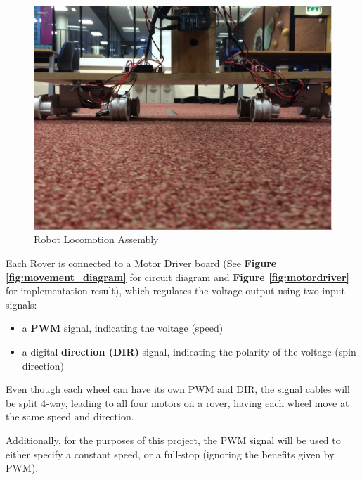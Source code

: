 \documentclass[12p,a4paper]{report}
\begin{document}
\begin{figure}[H]
\begin{center}
\includegraphics[scale=0.40]{rover5duo_low}
\caption{Robot Locomotion Assembly}
\label{fig:rover5duo}
\end{center}
\end{figure}
\newpage
\vspace*{-35pt}
Each Rover is connected to a Motor Driver board (See \textbf{Figure \ref{fig:movement_diagram}} for circuit diagram and \textbf{Figure \ref{fig:motordriver}} for implementation result), which regulates the voltage output using two input signals:

\begin{itemize}
\item a \textbf{PWM} signal, indicating the voltage (speed)
\item a digital \textbf{direction (DIR)} signal, indicating the polarity of the voltage (spin direction)
\end{itemize}

Even though each wheel can have its own PWM and DIR, the signal cables will be split 4-way, leading to all four motors on a rover, having each wheel move at the same speed and direction.

Additionally, for the purposes of this project, the PWM signal will be used to either specify a constant speed, or a full-stop (ignoring the benefits given by PWM).
\end{document}
